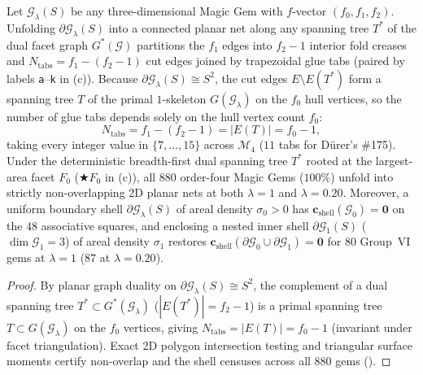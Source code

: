 \begin{proposition}
\label{prop:papercraft-net}
Let $\mathcal G_\lambda(S)$ be any three-dimensional Magic Gem with $f$-vector $(f_0,f_1,f_2)$. Unfolding $\partial\mathcal G_\lambda(S)$ into a connected planar net along any spanning tree $T^*$ of the dual facet graph $G^*(\mathcal G)$ \citep{demaine2007geometric,durer1525underweysung,ghomi2014durer,shephard1975convex} partitions the $f_1$ edges into $f_2-1$ interior fold creases and $N_{\mathrm{tabs}}=f_1-(f_2-1)$ cut edges joined by trapezoidal glue tabs (paired by labels \texttt{a}--\texttt{k} in (c)). Because $\partial\mathcal G_\lambda(S)\cong S^2$, the cut edges $E\setminus E(T^*)$ form a spanning tree $T$ of the primal $1$-skeleton $G(\mathcal G_\lambda)$ on the $f_0$ hull vertices, so the number of glue tabs depends solely on the hull vertex count $f_0$:
\begin{equation}
\label{eq:glue-tabs}
N_{\mathrm{tabs}} = f_1 - (f_2 - 1) = |E(T)| = f_0 - 1,
\end{equation}
taking every integer value in $\{7,\dots,15\}$ across $\mathcal M_4$ ($11$ tabs for D\"urer's \#175). Under the deterministic breadth-first dual spanning tree $T^*$ rooted at the largest-area facet $F_0$ ($\bigstar F_0$ in (c)), all $880$ order-four Magic Gems ($100\%$) unfold into strictly non-overlapping 2D planar nets at both $\lambda=1$ and $\lambda=0.20$. Moreover, a uniform boundary shell $\partial\mathcal G_\lambda(S)$ of areal density $\sigma_0>0$ has $\mathbf c_{\mathrm{shell}}(\mathcal G_0)=\mathbf 0$ on the $48$ associative squares, and enclosing a nested inner shell $\partial\mathcal G_1(S)$ ($\dim\mathcal G_1=3$) of areal density $\sigma_1$ restores $\mathbf c_{\mathrm{shell}}(\partial\mathcal G_0\cup\partial\mathcal G_1)=\mathbf 0$ for $80$ Group~VI gems at $\lambda=1$ ($87$ at $\lambda=0.20$).
\end{proposition}

\begin{proof}
By planar graph duality on $\partial\mathcal G_\lambda(S)\cong S^2$, the complement of a dual spanning tree $T^*\subset G^*(\mathcal G_\lambda)$ ($|E(T^*)|=f_2-1$) is a primal spanning tree $T\subset G(\mathcal G_\lambda)$ on the $f_0$ vertices, giving $N_{\mathrm{tabs}}=|E(T)|=f_0-1$ (invariant under facet triangulation). Exact 2D polygon intersection testing and triangular surface moments certify non-overlap and the shell censuses across all $880$ gems ().
\end{proof}

